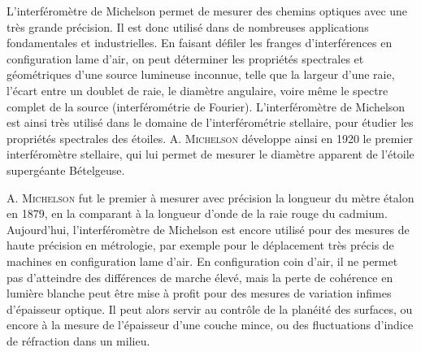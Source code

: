 \documentclass[12pt,fancy]{cours}
\begin{document}
L'interféromètre de Michelson permet de mesurer des chemins optiques avec une très grande précision. Il est donc utilisé dans de nombreuses applications fondamentales et industrielles.
  En faisant défiler les franges d'interférences en configuration lame d'air, on peut déterminer les propriétés spectrales et géométriques d'une source lumineuse inconnue, telle que la largeur d'une raie, l'écart entre un doublet de raie, le diamètre angulaire, voire même le spectre complet de la source (interférométrie de Fourier). L'interféromètre de Michelson est ainsi très utilisé dans le domaine de l'interférométrie stellaire, pour étudier les propriétés spectrales des étoiles. A. \textsc{Michelson} développe ainsi en 1920 le premier interféromètre stellaire, qui lui permet de mesurer le diamètre apparent de l'étoile supergéante Bételgeuse.

  A. \textsc{Michelson} fut le premier à mesurer avec précision la longueur du mètre étalon en 1879, en la comparant à la longueur d'onde de la raie rouge du cadmium. Aujourd'hui, l'interféromètre de Michelson est encore utilisé pour des mesures de haute précision en métrologie, par exemple pour le déplacement très précis de machines en configuration lame d'air. En configuration coin d'air, il ne permet pas d'atteindre des différences de marche élevé, mais la perte de cohérence en lumière blanche peut être mise à profit pour des mesures de variation infimes d'épaisseur optique. Il peut alors servir au contrôle de la planéité des surfaces, ou encore à la mesure de l'épaisseur d'une couche mince, ou des fluctuations d'indice de réfraction dans un milieu.

\end{document}
